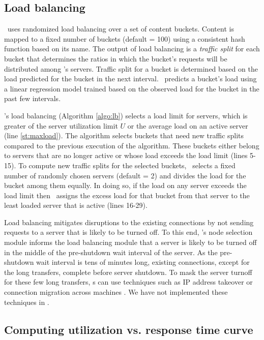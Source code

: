 \subsection{Load balancing}
\label{sec:load-bal}
\shrink\  uses randomized load balancing over a set of content buckets. Content is mapped to a fixed number of buckets (default = 100) using a consistent hash function based on its name. The output of load balancing is a \emph{traffic split} for each bucket that determines the ratios in which the bucket's requests will be distributed among \cdc's servers. Traffic split for a bucket is determined based on the load predicted for the bucket in the next interval. \shrink\ predicts a bucket's load using a linear regression model trained based on the observed load for the bucket in the past few intervals.

\shrink's load balancing (Algorithm \ref{algo:lb}) selects a load limit for servers, which is greater of the server utilization limit $U$ or the average load on an active server (line \ref{st:maxload}). The algorithm selects buckets that need new traffic splits compared to the previous execution of the algorithm. These buckets either belong to servers that are no longer active or whose load exceeds the  load limit (lines 5-15). 
To compute new traffic splits for the selected buckets, \shrink\ selects a fixed number of randomly chosen servers (default = 2)  and divides the load for the bucket among them equally. In doing so, if the load on any server exceeds the load limit then \shrink\ assigns the excess load for that bucket from that server to the least loaded server that is active (lines 16-29). 

Load balancing mitigates disruptions to the existing connections by not sending requests to a server that is likely to be turned off. To this end, \shrink's node selection module informs the load balancing module that a server is likely to be turned off in the middle of the pre-shutdown wait interval of the server. As the pre-shutdown wait interval is tens of minutes long, existing connections, except for the long transfers, complete before server shutdown. To mask the server turnoff for these few long transfers, \cdc s can use techniques such as  IP address takeover \cite{flickenger2003linux} or connection migration across machines \cite{snoeren2001fine,sultan2002migratory}. We have not implemented these techniques in \shrink.

\subsection{Computing utilization vs. response time curve}
\label{sec:utilization-vs-responsetime}

